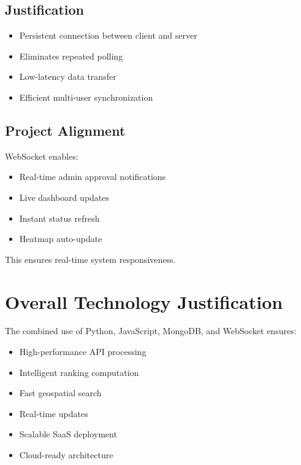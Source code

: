 \documentclass[12pt,a4paper]{report}
\begin{document}
\subsection*{Justification}

\begin{itemize}

\item Persistent connection between client and server

\item Eliminates repeated polling

\item Low-latency data transfer

\item Efficient multi-user synchronization

\end{itemize}

\subsection*{Project Alignment}

WebSocket enables:

\begin{itemize}

\item Real-time admin approval notifications

\item Live dashboard updates

\item Instant status refresh

\item Heatmap auto-update

\end{itemize}

This ensures real-time system responsiveness.

\section{Overall Technology Justification}

The combined use of Python, JavaScript, MongoDB, and WebSocket ensures:

\begin{itemize}

\item High-performance API processing

\item Intelligent ranking computation

\item Fast geospatial search

\item Real-time updates

\item Scalable SaaS deployment

\item Cloud-ready architecture

\end{itemize}
\end{document}
